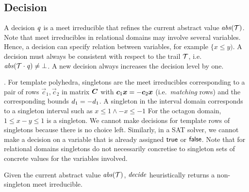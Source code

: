 \subsection{Decision}
A decision $\mathit{q}$ is a meet irreducible that refines the
current abstract value $\mathit{abs}(\mathcal{T})$.  Note that meet irreducibles in
relational domains may involve several variables.
%
%
Hence, a decision can specify relation between variables, for example 
$\{x \leq y)$.  A decision must always be consistent with respect to 
the trail $\mathcal{T}$, i.e.\ $\mathit{abs}(\mathcal{T}\cdot \mathit{q})\neq \bot$.  
A new decision always increases the decision level by one. 

.
%
For template polyhedra, singletons are the meet irreducibles
corresponding to a pair of rows $\vec{c}_1,\vec{c}_2$ in matrix
${\boldsymbol C}$ with ${\boldsymbol c}_1{\boldsymbol {x}}=-{\boldsymbol c}_2{\boldsymbol {x}}$
(i.e.\ \emph{matching} rows) and the corresponding bounds
$d_1=-d_1$.
%
A singleton in the interval domain corresponds to a singleton interval
such as $x\leq 1 \wedge -x\leq -1$ For the octagon domain, $1 \leq x-y
\leq 1$ is a singleton.
%
We cannot make decisions for template rows of singletons because there
is no choice left. Similarly, in a SAT solver, we cannot make a
decision on a variable that is already assigned $\mathsf{true}$ or $\mathsf{false}$.
%
Note that for relational domains singletons do not necessarily
concretise to singleton sets of concrete values for the variables
involved.


Given 
the current abstract value $\mathit{abs}(\mathcal{T})$, $\mathit{decide}$ heuristically
returns a non-singleton meet irreducible.

